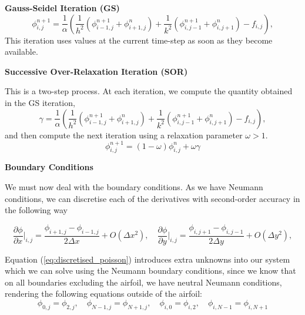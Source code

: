 \documentclass[12pt]{article}
\begin{document}
    \textbf{Gauss-Seidel Iteration (GS)}
    \begin{equation}
        \phi_{i, j}^{n+1} = \frac{1}{\alpha}\left(\frac{1}{h^2}(\phi_{i-1,j}^{n+1} + \phi_{i+1,j}^{n}) + \frac{1}{k^2}(\phi_{i,j - 1}^{n+1} + \phi_{i,j + 1}^{n}) - f_{i, j}\right),
    \end{equation}
    This iteration uses values at the current time-step as soon as they become available.

    \textbf{Successive Over-Relaxation Iteration (SOR)}

    This is a two-step process. At each iteration, we compute the quantity obtained in the GS iteration,
    \begin{equation}
        \gamma = \frac{1}{\alpha}\left(\frac{1}{h^2}(\phi_{i-1,j}^{n+1} + \phi_{i+1,j}^{n}) + \frac{1}{k^2}(\phi_{i,j - 1}^{n+1} + \phi_{i,j + 1}^{n}) - f_{i, j}\right),
    \end{equation}
    and then compute the next iteration using a relaxation parameter $\omega > 1.$
    \begin{equation}
        \phi_{i, j}^{n+1} = (1 - \omega)\phi_{i, j}^{n} + \omega \gamma
    \end{equation}

    \textbf{Boundary Conditions}

    We must now deal with the boundary conditions. As we have Neumann conditions, we can discretise each of the derivatives with second-order accuracy in the following way

    \begin{equation}\label{eq:second_order_1fd}
        \frac{\partial \phi}{\partial x} \bigg\rvert_{i, j} = \frac{\phi_{i+1, j} - \phi_{i-1, j}}{2\Delta x} + O(\Delta x^2), \quad \frac{\partial \phi}{\partial y} \bigg\rvert_{i, j} = \frac{\phi_{i, j+1} - \phi_{i, j-1}}{2\Delta y} + O(\Delta y^2),
    \end{equation}

    Equation (\ref{eq:discretised_poisson}) introduces extra unknowns into our system which we can solve using the Neumann boundary conditions, since we know that on all boundaries excluding the airfoil, we have neutral Neumann conditions, rendering the following equations outside of the airfoil:
    \begin{equation}
        \phi_{0, j} = \phi_{2, j}, \quad \phi_{N-1, j} = \phi_{N+1, j}, \quad \phi_{i, 0} = \phi_{i, 2}, \quad \phi_{i, N-1} = \phi_{i, N+1}
    \end{equation}
\end{document}
